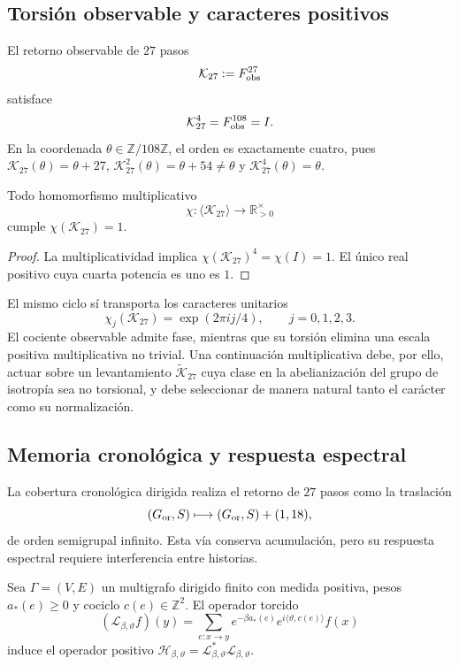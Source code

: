 \subsection{Torsión observable y caracteres positivos}

El retorno observable de \(27\) pasos
\[
 \mathcal K_{27}:=F_{\rm obs}^{27}
\]
satisface
\[
 \mathcal K_{27}^{4}=F_{\rm obs}^{108}=I.
\]
En la coordenada \(\theta\in\mathbb Z/108\mathbb Z\), el orden es
exactamente cuatro, pues
\(\mathcal K_{27}(\theta)=\theta+27\),
\(\mathcal K_{27}^{2}(\theta)=\theta+54\neq\theta\) y
\(\mathcal K_{27}^{4}(\theta)=\theta\).

\begin{theorem}
\label{thm:caracter-positivo-G-rev11}
Todo homomorfismo multiplicativo
\[
 \chi:\langle\mathcal K_{27}\rangle
 \longrightarrow\mathbb R_{>0}^{\times}
\]
cumple \(\chi(\mathcal K_{27})=1\).
\end{theorem}

\begin{proof}
La multiplicatividad implica
\(\chi(\mathcal K_{27})^4=\chi(I)=1\).
El único real positivo cuya cuarta potencia es uno es \(1\).
\end{proof}

El mismo ciclo sí transporta los caracteres unitarios
\[
 \chi_j(\mathcal K_{27})=\exp(2\pi ij/4),
 \qquad j=0,1,2,3.
\]
El cociente observable admite fase, mientras que su torsión elimina una
escala positiva multiplicativa no trivial. Una continuación multiplicativa debe, por ello,
actuar sobre un levantamiento \(\widetilde{\mathcal K}_{27}\) cuya clase en
la abelianización del grupo de isotropía sea no torsional, y debe seleccionar
de manera natural tanto el carácter como su normalización.

\subsection{Memoria cronológica y respuesta espectral}
\label{sec:respuesta-espectral-G-rev11}

La cobertura cronológica dirigida realiza el retorno de \(27\) pasos como la
traslación
\[
 (G_{\rm or},S)\longmapsto(G_{\rm or},S)+(1,18),
\]
de orden semigrupal infinito. Esta vía conserva acumulación, pero su
respuesta espectral requiere interferencia entre historias.

Sea \(\Gamma=(V,E)\) un multigrafo dirigido finito con medida positiva,
pesos \(a_\ast(e)\geq0\) y cociclo \(c(e)\in\mathbb Z^2\). El operador
torcido
\[
 (\mathcal L_{\beta,\vartheta}f)(y)
 =\sum_{e:x\to y}
 e^{-\beta a_\ast(e)}e^{i\langle\vartheta,c(e)\rangle}f(x)
\]
induce el operador positivo
\(\mathcal H_{\beta,\vartheta}
=\mathcal L_{\beta,\vartheta}^{*}\mathcal L_{\beta,\vartheta}\).

